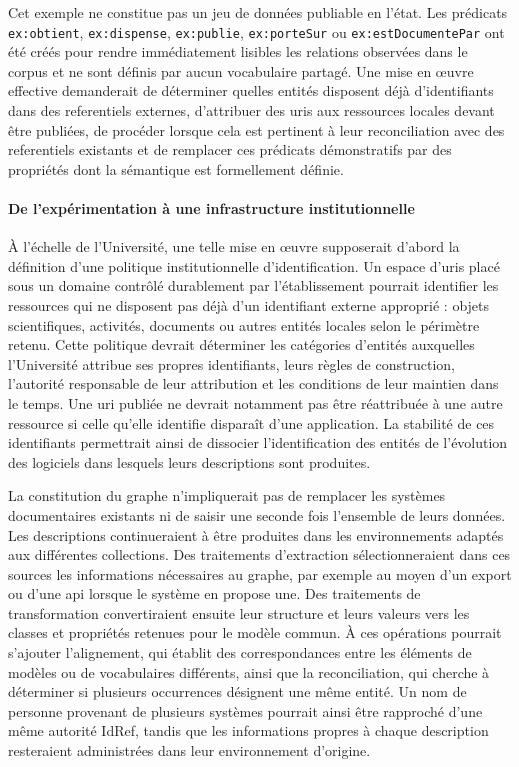 Cet exemple ne constitue pas un jeu de données publiable en l'état. Les prédicats \verb|ex:obtient|, \verb|ex:dispense|, \verb|ex:publie|, \verb|ex:porteSur| ou \verb|ex:estDocumentePar| ont été créés pour rendre immédiatement lisibles les relations observées dans le corpus et ne sont définis par aucun vocabulaire partagé. Une mise en œuvre effective demanderait de déterminer quelles entités disposent déjà d'identifiants dans des \glspl{referentiel} externes, d'attribuer des \glspl{uri} aux ressources locales devant être publiées, de procéder lorsque cela est pertinent à leur \gls{reconciliation} avec des \glspl{referentiel} existants et de remplacer ces prédicats démonstratifs par des propriétés dont la sémantique est formellement définie.


\paragraph{De l'expérimentation à une infrastructure institutionnelle}

À l'échelle de l'Université, une telle mise en œuvre supposerait d'abord la définition d'une politique institutionnelle d'identification. Un espace d'\glspl{uri} placé sous un domaine contrôlé durablement par l'établissement pourrait identifier les ressources qui ne disposent pas déjà d'un identifiant externe approprié : objets scientifiques, activités, documents ou autres entités locales selon le périmètre retenu. Cette politique devrait déterminer les catégories d'entités auxquelles l'Université attribue ses propres identifiants, leurs règles de construction, l'autorité responsable de leur attribution et les conditions de leur maintien dans le temps. Une \gls{uri} publiée ne devrait notamment pas être réattribuée à une autre ressource si celle qu'elle identifie disparaît d'une application. La stabilité de ces identifiants permettrait ainsi de dissocier l'identification des entités de l'évolution des logiciels dans lesquels leurs descriptions sont produites.

La constitution du graphe n'impliquerait pas de remplacer les systèmes documentaires existants ni de saisir une seconde fois l'ensemble de leurs données. Les descriptions continueraient à être produites dans les environnements adaptés aux différentes collections. Des traitements d'extraction sélectionneraient dans ces sources les informations nécessaires au graphe, par exemple au moyen d'un export ou d'une \gls{api} lorsque le système en propose une. Des traitements de transformation convertiraient ensuite leur structure et leurs valeurs vers les classes et propriétés retenues pour le modèle commun. À ces opérations pourrait s'ajouter l'\gls{alignement}, qui établit des correspondances entre les éléments de modèles ou de vocabulaires différents, ainsi que la \gls{reconciliation}, qui cherche à déterminer si plusieurs occurrences désignent une même entité. Un nom de personne provenant de plusieurs systèmes pourrait ainsi être rapproché d'une même autorité IdRef, tandis que les informations propres à chaque description resteraient administrées dans leur environnement d'origine.

